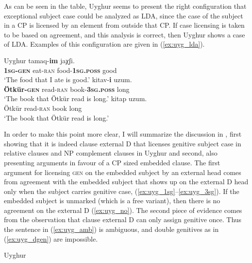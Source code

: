 \documentclass[output=paper
,modfonts
,nonflat]{langsci/langscibook}
\begin{document}
As can be seen in the table, Uyghur seems to present the right configuration that exceptional subject case could be analyzed as LDA, since the case of the subject in a CP is licensed by an element from outside that CP. If case licensing is taken to be based on agreement, and this analysis is correct, then Uyghur shows a case of LDA. Examples of this configuration are given in (\ref{ex:uyg_lda}).
\begin{exe}
\ex Uyghur \citep[][4]{Asarina_Hartman2011b}\label{ex:uyg_lda}
	\xlist
	\ex 
		 tamaq-\textbf{im} jaχʃi.\\
		 	 {} \textbf{\textsc{1sg}-\textsc{gen}} eat-\textsc{ran} {} food-\textbf{1\textsc{sg.poss}} good\\
		\glt `The food that I ate is good.'\label{ex:uyg_1sg}
	\ex
		 kitav-\textbf{i} uzum.\\
			 {} \textbf{Ötkür-\textsc{gen}} read-\textsc{ran} {} book-\textbf{3\textsc{sg.poss}} long\\
		\glt `The book that Ötkür read is long.'\label{ex:uyg_3sg}
	\ex
		 kitap uzum.\\
			 {} Ötkür read-\textsc{ran} {} book long\\
		\glt `The book that Ötkür read is long.'\label{ex:uyg_no}
	\endxlist
\end{exe}
In order to make this point more clear, I will summarize the discussion in \citet{Asarina_Hartman2011a}, first showing that it is indeed clause external D that licenses genitive subject case in relative clauses and NP complement clauses in Uyghur and second, also presenting arguments in favour of a CP sized embedded clause. The first argument for licensing \textsc{gen} on the embedded subject by an external head comes from agreement with the embedded subject that shows up on the external D head only when the subject carries genitive case, (\ref{ex:uyg_1sg}--\ref{ex:uyg_3sg}). If the embedded subject is unmarked (which is a free variant), then there is no agreement on the external D (\ref{ex:uyg_no}). The second piece of evidence comes from the observation that clause external D can only assign genitive once. Thus the sentence in (\ref{ex:uyg_amb}) is ambiguous, and double genitives as in (\ref{ex:uyg_dgen}) are impossible.
\begin{exe}
\ex Uyghur \citep[][3]{Asarina_Hartman2011a}
	\xlist
	\endxlist
\end{exe}
\end{document}
